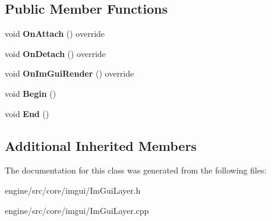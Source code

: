 \subsection*{Public Member Functions}
\begin{DoxyCompactItemize}
\item 
\mbox{\label{classengine_1_1imgui_1_1ImGuiLayer_ab3820ce44fcc9471f14c905510848f3e}} 
void {\bfseries On\+Attach} () override
\item 
\mbox{\label{classengine_1_1imgui_1_1ImGuiLayer_af84a7c8e766167706345754587ced38e}} 
void {\bfseries On\+Detach} () override
\item 
\mbox{\label{classengine_1_1imgui_1_1ImGuiLayer_aaa2388f874b2ede821ec8ba4f8642900}} 
void {\bfseries On\+Im\+Gui\+Render} () override
\item 
\mbox{\label{classengine_1_1imgui_1_1ImGuiLayer_a246081f496037b22475d76e3a9897ac9}} 
void {\bfseries Begin} ()
\item 
\mbox{\label{classengine_1_1imgui_1_1ImGuiLayer_a7ad4c7169268bc19745b50b00282c9a9}} 
void {\bfseries End} ()
\end{DoxyCompactItemize}
\subsection*{Additional Inherited Members}


The documentation for this class was generated from the following files\+:\begin{DoxyCompactItemize}
\item 
engine/src/core/imgui/Im\+Gui\+Layer.\+h\item 
engine/src/core/imgui/Im\+Gui\+Layer.\+cpp\end{DoxyCompactItemize}
